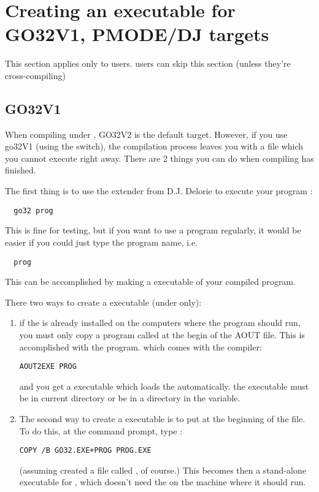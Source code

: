 \documentclass{report}
\begin{document}
\section{Creating an executable for GO32V1, PMODE/DJ targets}

This section applies only to \dos users. \linux users can skip this
section (unless they're cross-compiling)


%
%

\subsection{GO32V1}
When compiling under \dos, GO32V2 is the default target. However, if you use
go32V1 (using the  switch), the 
compilation process leaves you with a file which you cannot execute right away.
There are 2 things you can do when compiling has finished.

The first thing is to use the \dos extender from D.J. Delorie to execute
your program :
\begin{verbatim}
  go32 prog
\end{verbatim}
This is fine for testing, but if you want to use a program regularly, it
would be easier if you could just type the program name, i.e.
\begin{verbatim}
  prog
\end{verbatim}
This can be accomplished by making a \dos executable of your compiled program.
 
There two ways to create a \dos executable (under \dos only): 
\begin{enumerate}
\item if the  is already
installed on the computers where the program should run, you must
only copy a program called  at the begin of
the AOUT file. This is accomplished with the  program. 
which comes with the compiler:
\begin{verbatim}
AOUT2EXE PROG
\end{verbatim}
and you get a \dos executable which loads the  automatically. 
the  executable must be in current directory or be 
in a directory in the  variable.
\item
The second way to create a \dos executable is to put 
 at the beginning of the  file. To do this, at the
command prompt, type :
\begin{verbatim}
COPY /B GO32.EXE+PROG PROG.EXE
\end{verbatim}
(assuming \fpk created a file called , of course.)
This becomes then a stand-alone executable for \dos, which doesn't need the
 on the machine where it should run.
\end{enumerate}
\end{document}
